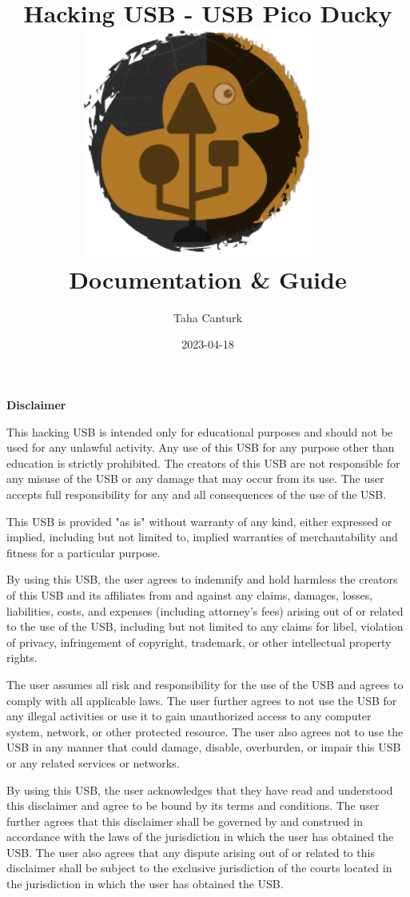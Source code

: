\documentclass[a4paper,12pt]{article}
\title{
	\Huge Hacking USB - USB Pico Ducky\\
\includegraphics[width=75.5mm]{pictures/logo.png}
	\ \\
	\Large Documentation \& Guide
}
\author{Taha Canturk}
\date{2023-04-18}
\begin{document}
\maketitle

\newpage

\textbf{Disclaimer}

\vspace{0.2in}

This hacking USB is intended only for educational purposes and should not be used for any unlawful activity. Any use of this USB for any purpose other than education is strictly prohibited. The creators of this USB are not responsible for any misuse of the USB or any damage that may occur from its use. The user accepts full responsibility for any and all consequences of the use of the USB.

This USB is provided "as is" without warranty of any kind, either expressed or implied, including but not limited to, implied warranties of merchantability and fitness for a particular purpose.

By using this USB, the user agrees to indemnify and hold harmless the creators of this USB and its affiliates from and against any claims, damages, losses, liabilities, costs, and expenses (including attorney's fees) arising out of or related to the use of the USB, including but not limited to any claims for libel, violation of privacy, infringement of copyright, trademark, or other intellectual property rights.

The user assumes all risk and responsibility for the use of the USB and agrees to comply with all applicable laws. The user further agrees to not use the USB for any illegal activities or use it to gain unauthorized access to any computer system, network, or other protected resource. The user also agrees not to use the USB in any manner that could damage, disable, overburden, or impair this USB or any related services or networks.

By using this USB, the user acknowledges that they have read and understood this disclaimer and agree to be bound by its terms and conditions. The user further agrees that this disclaimer shall be governed by and construed in accordance with the laws of the jurisdiction in which the user has obtained the USB. The user also agrees that any dispute arising out of or related to this disclaimer shall be subject to the exclusive jurisdiction of the courts located in the jurisdiction in which the user has obtained the USB.
\end{document}
